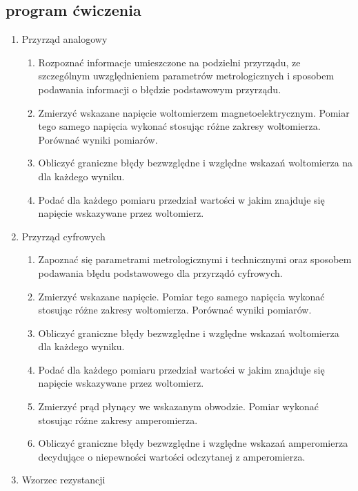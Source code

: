 \documentclass{article}  %
\begin{document}
    \subsection{program ćwiczenia}
    \begin{enumerate}
        \item Przyrząd analogowy
        \begin{enumerate}
            \item Rozpoznać informacje umieszczone na podzielni przyrządu, 
            ze szczególnym uwzględnieniem parametrów metrologicznych i sposobem podawania informacji o błędzie podstawowym przyrządu.
            \item Zmierzyć wskazane napięcie woltomierzem magnetoelektrycznym. 
            Pomiar tego samego napięcia wykonać stosując różne zakresy woltomierza. Porównać wyniki pomiarów.
            \item Obliczyć  graniczne  błędy  bezwzględne  i  względne  wskazań  woltomierza  na  dla  każdego wyniku.
            \item Podać dla każdego pomiaru przedział wartości w jakim znajduje się napięcie wskazywane przez woltomierz. 
        \end{enumerate}
        \item Przyrząd cyfrowych
            \begin{enumerate}
                \item Zapoznać się parametrami metrologicznymi i technicznymi oraz sposobem podawania błędu podstawowego dla przyrządó cyfrowych.
                \item Zmierzyć wskazane napięcie. Pomiar tego samego napięcia  wykonać stosując różne zakresy woltomierza. Porównać wyniki pomiarów.
                \item Obliczyć graniczne błędy bezwzględne i względne wskazań woltomierza dla każdego wyniku.
                \item Podać dla każdego pomiaru przedział wartości w jakim znajduje się napięcie wskazywane przez woltomierz.
                \item Zmierzyć prąd płynący we wskazanym obwodzie. Pomiar wykonać stosując  różne zakresy amperomierza.
                \item Obliczyć graniczne błędy bezwzględne i względne wskazań amperomierza decydujące o niepewności wartości odczytanej z amperomierza.
            \end{enumerate}
        \item Wzorzec rezystancji
            \begin{enumerate}

\end{enumerate}
\end{enumerate}
\end{document}
